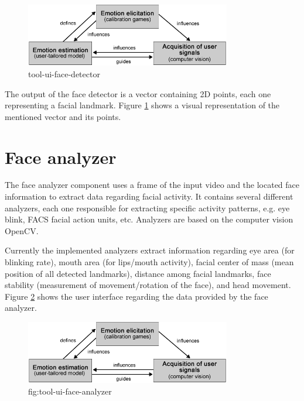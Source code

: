 \begin{figure}[h]
    \centering
    \includegraphics[width=0.8\textwidth]{figures/method-components-dependency.png}
    \caption{tool-ui-face-detector}
    \label{fig:tool-ui-face-detector}
\end{figure}

The output of the face detector is a vector containing 2D points, each one representing a facial landmark. Figure \ref{fig:tool-ui-face-detector} shows a visual representation of the mentioned vector and its points.

\section{Face analyzer}

The face analyzer component uses a frame of the input video and the located face information to extract data regarding facial activity. It contains several different analyzers, each one responsible for extracting specific activity patterns, e.g. eye blink, FACS facial action units, etc. Analyzers are based on the computer vision OpenCV.

Currently the implemented analyzers extract information regarding eye area (for blinking rate), mouth area (for lips/mouth activity), facial center of mass (mean position of all detected landmarks), distance among facial landmarks, face stability (measurement of movement/rotation of the face), and head movement. Figure \ref{fig:tool-ui-face-analyzer} shows the user interface regarding the data provided by the face analyzer.

\begin{figure}[h]
    \centering
    \includegraphics[width=0.8\textwidth]{figures/method-components-dependency.png}
    \caption{fig:tool-ui-face-analyzer}
    \label{fig:tool-ui-face-analyzer}
\end{figure}

